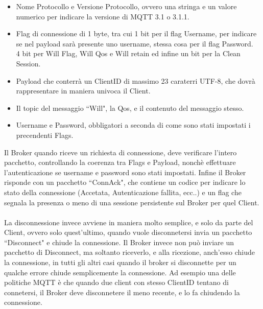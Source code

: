 \documentclass{article}
\begin{document}
\begin{itemize}
	\item Nome Protocollo e Versione Protocollo, ovvero una stringa e un valore numerico per indicare la versione di MQTT 3.1 o 3.1.1.
	\item Flag di connessione di 1 byte, tra cui 1 bit per il flag Username, per indicare se nel payload sarà presente uno username, stessa cosa per il flag Password.\\4 bit per Will Flag, Will Qos e Will retain ed infine un bit per la Clean Session. 
	\item Payload che conterrà un ClientID di massimo 23 caraterri UTF-8, che dovrà rappresentare in maniera univoca il Client.
	\item Il topic del messaggio ``Will", la Qos, e il contenuto del messaggio stesso.
	\item Username e Password, obbligatori a seconda di come sono stati impostati i precendenti Flags.
\end{itemize}
Il Broker quando riceve un richiesta di connessione, deve verificare l'intero pacchetto, controllando la coerenza tra Flags e Payload, nonchè effettuare l'autenticazione se username e password sono stati impostati. Infine il Broker risponde con un pacchetto ``ConnAck", che contiene un codice per indicare lo stato della connessione (Accetata, Autenticazione fallita, ecc..) e un flag che segnala la presenza o meno di una sessione persistente sul Broker per quel Client.\\\\La disconnessione invece avviene in maniera molto semplice, e solo da parte del Client, ovvero solo quest'ultimo, quando vuole disconnetersi invia un pacchetto ``Disconnect" e chiude la connessione. Il Broker invece non può inviare un pacchetto di Disconnect, ma soltanto riceverlo, e alla ricezione, anch'esso chiude la connessione, in tutti gli altri casi quando il broker si disconnette per un qualche errore chiude semplicemente la connessione. Ad esempio una delle politiche MQTT è che quando due client con stesso ClientID tentano di connetersi, il Broker deve disconnetere il meno recente, e lo fa chiudendo la connessione.
\end{document}
